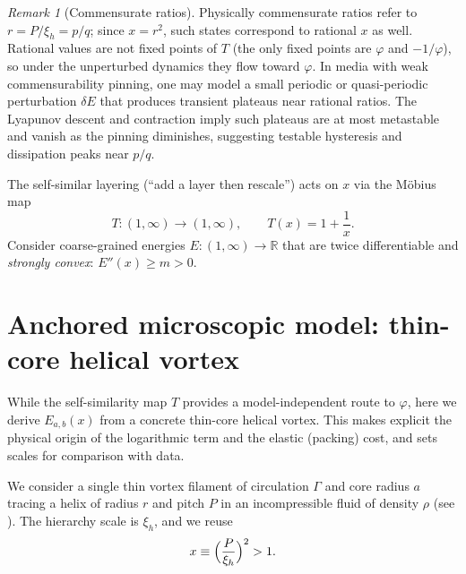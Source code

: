 \documentclass[11pt]{article}
\theoremstyle{remark}
\newtheorem{remark}{Remark}
\theoremstyle{definition}
\newcommand{\R}{\mathbb{R}}
\begin{document}
\begin{remark}[Commensurate ratios]
Physically commensurate ratios refer to $r=P/\xi_h=p/q$; since $x=r^2$, such states correspond to rational $x$ as well. Rational values are not fixed points of $T$ (the only fixed points are $\varphi$ and $-1/\varphi$), so under the unperturbed dynamics they flow toward $\varphi$.
In media with weak commensurability pinning, one may model a small periodic or quasi-periodic perturbation $\delta E$ that produces transient plateaus near rational ratios.
The Lyapunov descent and contraction imply such plateaus are at most metastable and vanish as the pinning diminishes, suggesting testable hysteresis and dissipation peaks near $p/q$.
\end{remark}

The self-similar layering (``add a layer then rescale'') acts on $x$ via the M\"obius map
\begin{equation}
 T:(1,\infty)\to(1,\infty),\qquad T(x)=1+\frac{1}{x}.
 \label{eq:Tmap}
\end{equation}
Consider coarse-grained energies $E:(1,\infty)\to\R$ that are twice differentiable and \emph{strongly convex}: $E''(x)\ge m>0$.

\section{Anchored microscopic model: thin-core helical vortex}
\label{sec:anchor-model}

While the self-similarity map $T$ provides a model-independent route to $\varphi$, here we derive $E_{a,b}(x)$ from a concrete thin-core helical vortex. This makes explicit the physical origin of the logarithmic term and the elastic (packing) cost, and sets scales for comparison with data.

We consider a single thin vortex filament of circulation $\Gamma$ and core radius $a$ tracing a helix of radius $r$ and pitch $P$ in an incompressible fluid of density $\rho$ (see \cite{Saffman1992,Fetter2009,Widnall1972,Hardin1982,FukumotoOkulov2005}). The hierarchy scale is $\xi_h$, and we reuse
\[
x \equiv \Bigl(\frac{P}{\xi_h}\Bigr)^2>1.
\]
\end{document}

